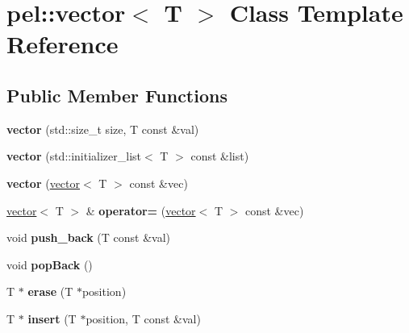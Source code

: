 \hypertarget{classpel_1_1vector}{}\section{pel\+:\+:vector$<$ T $>$ Class Template Reference}
\label{classpel_1_1vector}
\subsection*{Public Member Functions}
\begin{DoxyCompactItemize}
\item 
\hypertarget{classpel_1_1vector_a2d6ade350f47ad9d51e242d6ca3f9bbf}{}{\bfseries vector} (std\+::size\+\_\+t size, T const \&val)\label{classpel_1_1vector_a2d6ade350f47ad9d51e242d6ca3f9bbf}

\item 
\hypertarget{classpel_1_1vector_af577c9c6cc5f874401acb5bbc8b9eb1d}{}{\bfseries vector} (std\+::initializer\+\_\+list$<$ T $>$ const \&list)\label{classpel_1_1vector_af577c9c6cc5f874401acb5bbc8b9eb1d}

\item 
\hypertarget{classpel_1_1vector_abb4c3a5e1c9bf1a4478da27d523e87b1}{}{\bfseries vector} (\hyperlink{classpel_1_1vector}{vector}$<$ T $>$ const \&vec)\label{classpel_1_1vector_abb4c3a5e1c9bf1a4478da27d523e87b1}

\item 
\hypertarget{classpel_1_1vector_ae6e2cef781fb6c7c8928e713db03c979}{}\hyperlink{classpel_1_1vector}{vector}$<$ T $>$ \& {\bfseries operator=} (\hyperlink{classpel_1_1vector}{vector}$<$ T $>$ const \&vec)\label{classpel_1_1vector_ae6e2cef781fb6c7c8928e713db03c979}

\item 
\hypertarget{classpel_1_1vector_a7a212bdc9b333f02da662873ae43c7f4}{}void {\bfseries push\+\_\+back} (T const \&val)\label{classpel_1_1vector_a7a212bdc9b333f02da662873ae43c7f4}

\item 
\hypertarget{classpel_1_1vector_acec254d8fd9a74b9da0289d658fffac7}{}void {\bfseries pop\+Back} ()\label{classpel_1_1vector_acec254d8fd9a74b9da0289d658fffac7}

\item 
\hypertarget{classpel_1_1vector_a88ce6f8cb24ee294947f7eea34118d5d}{}T $\ast$ {\bfseries erase} (T $\ast$position)\label{classpel_1_1vector_a88ce6f8cb24ee294947f7eea34118d5d}

\item 
\hypertarget{classpel_1_1vector_a95b1a9c99affb5d89452cfe7db47a657}{}T $\ast$ {\bfseries insert} (T $\ast$position, T const \&val)\label{classpel_1_1vector_a95b1a9c99affb5d89452cfe7db47a657}


\end{DoxyCompactItemize}
